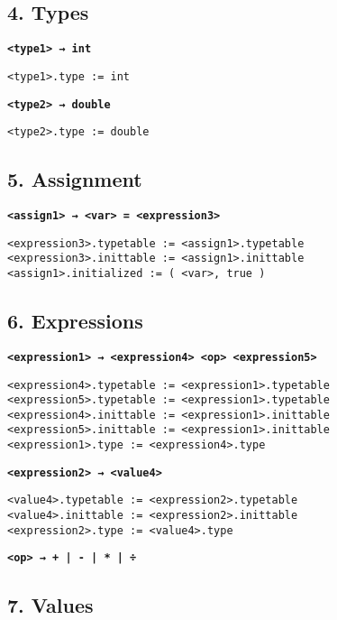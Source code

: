 \documentclass[12pt]{article}
\begin{document}
    \subsection*{4. Types}

    \textbf{\texttt{<type1> → int}}
    \begin{verbatim}
<type1>.type := int
    \end{verbatim}

    \textbf{\texttt{<type2> → double}}
    \begin{verbatim}
<type2>.type := double
    \end{verbatim}

    \subsection*{5. Assignment}

    \textbf{\texttt{<assign1> → <var> = <expression3>}}
    \begin{verbatim}
<expression3>.typetable := <assign1>.typetable
<expression3>.inittable := <assign1>.inittable
<assign1>.initialized := ( <var>, true )
    \end{verbatim}

    \subsection*{6. Expressions}

    \textbf{\texttt{<expression1> → <expression4> <op> <expression5>}}
    \begin{verbatim}
<expression4>.typetable := <expression1>.typetable
<expression5>.typetable := <expression1>.typetable
<expression4>.inittable := <expression1>.inittable
<expression5>.inittable := <expression1>.inittable
<expression1>.type := <expression4>.type
    \end{verbatim}

    \textbf{\texttt{<expression2> → <value4>}}
    \begin{verbatim}
<value4>.typetable := <expression2>.typetable
<value4>.inittable := <expression2>.inittable
<expression2>.type := <value4>.type
    \end{verbatim}

    \textbf{\texttt{<op> → + | - | * | ÷}}

    \subsection*{7. Values}
\end{document}
